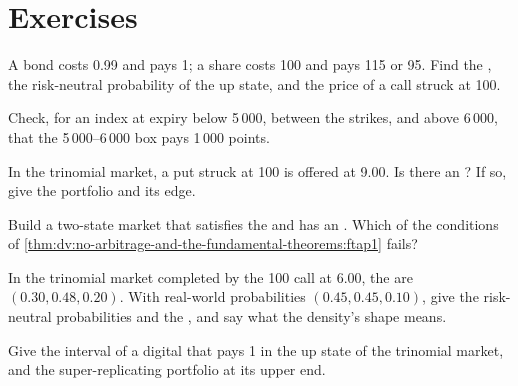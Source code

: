 \section{Exercises}

\begin{exercise}[$\star$]\label{exo:dv:no-arbitrage-and-the-fundamental-theorems:1}
A bond costs 0.99 and pays 1; a share costs 100 and pays 115 or 95. Find the , the risk-neutral probability of the up state, and the price of a call
struck at 100.
\end{exercise}

\begin{exercise}[$\star$]\label{exo:dv:no-arbitrage-and-the-fundamental-theorems:2}
Check, for an index at expiry below 5\,000, between the strikes, and above
6\,000, that the 5\,000--6\,000 box pays 1\,000 points.
\end{exercise}

\begin{exercise}[$\star$]\label{exo:dv:no-arbitrage-and-the-fundamental-theorems:3}
In the trinomial market, a put struck at 100 is offered at 9.00. Is there an
? If so, give the portfolio and its edge.
\end{exercise}

\begin{exercise}[$\star\star$]\label{exo:dv:no-arbitrage-and-the-fundamental-theorems:4}
Build a two-state market that satisfies the  and has an
. Which of the conditions of
\cref{thm:dv:no-arbitrage-and-the-fundamental-theorems:ftap1} fails?
\end{exercise}

\begin{exercise}[$\star\star$]\label{exo:dv:no-arbitrage-and-the-fundamental-theorems:5}
In the trinomial market completed by the 100 call at 6.00, the  are
$(0.30, 0.48, 0.20)$. With real-world probabilities $(0.45, 0.45, 0.10)$, give
the risk-neutral probabilities and the , and say what the
density's shape means.
\end{exercise}

\begin{exercise}[$\star\star$]\label{exo:dv:no-arbitrage-and-the-fundamental-theorems:6}
Give the  interval of a digital that pays 1 in the up state of the
trinomial market, and the super-replicating portfolio at its upper end.
\end{exercise}

